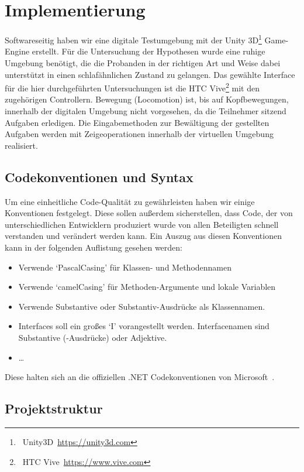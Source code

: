 \section{Implementierung}

Softwareseitig haben wir eine digitale Testumgebung mit der Unity 3D\footnote{~Unity3D~\url{https://unity3d.com}} Game-Engine erstellt. Für die Untersuchung der Hypothesen wurde eine ruhige Umgebung benötigt, die die Probanden in der richtigen Art und Weise dabei unterstützt in einen schlafähnlichen Zustand zu gelangen. 
Das gewählte Interface für die hier durchgeführten Untersuchungen ist die HTC Vive\footnote{~HTC Vive~\url{https://www.vive.com}} mit den zugehörigen Controllern. 
Bewegung (Locomotion) ist, bis auf Kopfbewegungen, innerhalb der digitalen Umgebung nicht vorgesehen, da die Teilnehmer sitzend Aufgaben erledigen. 
Die Eingabemethoden zur Bewältigung der gestellten Aufgaben werden mit Zeigeoperationen innerhalb der virtuellen Umgebung realisiert. 

\subsection{Codekonventionen und Syntax}

Um eine einheitliche Code-Qualität zu gewährleisten haben wir einige Konventionen festgelegt. Diese sollen außerdem sicherstellen, dass Code, der von unterschiedlichen Entwicklern produziert wurde von allen Beteiligten schnell verstanden und verändert werden kann.
Ein Auszug aus diesen Konventionen kann in der folgenden Auflistung gesehen werden: 
\begin{itemize}
    \item Verwende `PascalCasing' für Klassen- und Methodennamen
    \item Verwende `camelCasing' für Methoden-Argumente und lokale Variablen
    \item Verwende Substantive oder Substantiv-Ausdrücke als Klassennamen.
    \item Interfaces soll ein großes `I' vorangestellt werden. Interfacenamen sind Substantive (-Ausdrücke) oder Adjektive.
    \item \ldots
\end{itemize}

Diese halten sich an die offiziellen .NET Codekonventionen von Microsoft~\cite{online:condeConventions}.

\subsection{Projektstruktur}

